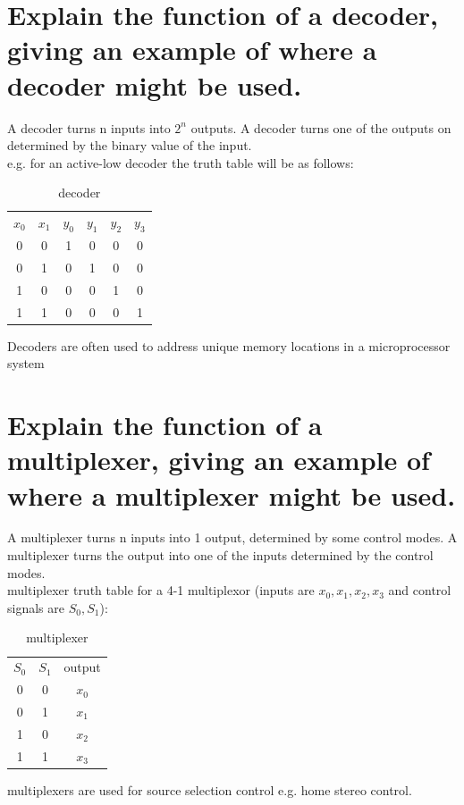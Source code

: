 \documentclass{article}
\begin{document}
\section{Explain the function of a decoder, giving an example of where a decoder might be used.}
A decoder turns n inputs into $2^n$ outputs. A decoder turns one of the outputs
on determined by the binary value of the input.\\
e.g. for an active-low decoder the truth table will be as follows:\\
\begin{table}[h]
    \centering
    \begin{tabular}{|c c|c c c c|}
        $x_0$ & $x_1$ & $y_0$ & $y_1$ & $y_2$ & $y_3$ \\
        0 & 0 & 1 & 0 & 0 & 0\\
        0 & 1 & 0 & 1 & 0 & 0\\
        1 & 0 & 0 & 0 & 1 & 0\\
        1 & 1 & 0 & 0 & 0 & 1
    \end{tabular}
    \caption{decoder}
    \label{tab:my_label}
\end{table}

Decoders are often used to address unique memory locations in a microprocessor
system
\newpage
\section{Explain the function of a multiplexer, giving an example of where a multiplexer might be used.}
A multiplexer turns n inputs into 1 output, determined by some control modes. A
multiplexer turns the output into one of the inputs determined by the control
modes.\\
multiplexer truth table for a 4-1 multiplexor (inputs are $x_0, x_1, x_2, x_3$
and control signals are $S_0, S_1$):\\
\begin{table}[h]
    \centering
    \begin{tabular}{|c c|c|}
        $S_0$ & $S_1$ & output\\
        0 & 0 & $x_0$\\
        0 & 1 & $x_1$\\
        1 & 0 & $x_2$\\
        1 & 1 & $x_3$
    \end{tabular}
    \caption{multiplexer}
    \label{tab:my_label}
\end{table}

multiplexers are used for source selection control e.g. home stereo control.
\end{document}

